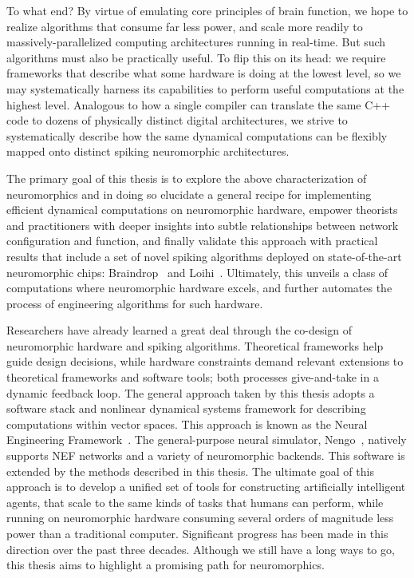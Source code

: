 To what end?
By virtue of emulating core principles of brain function, we hope to realize algorithms that consume far less power, and scale more readily to massively-parallelized computing architectures running in real-time.
But such algorithms must also be practically useful.
To flip this on its head: we require frameworks that describe what some hardware is doing at the lowest level,
so we may systematically harness its capabilities to perform useful computations at the highest level.
Analogous to how a single compiler can translate the same C++ code
to dozens of physically distinct digital architectures, we strive to systematically describe
how the same dynamical computations can be flexibly mapped onto distinct spiking neuromorphic architectures.

The primary goal of this thesis is to explore the above characterization of neuromorphics and in doing so elucidate a general recipe for implementing efficient dynamical computations on neuromorphic hardware, empower theorists and practitioners with deeper insights into subtle relationships between network configuration and function, and finally validate this approach with practical results that include a set of novel spiking algorithms deployed on state-of-the-art neuromorphic chips: Braindrop~\citep{braindrop2019} and Loihi~\citep{davies2018loihi}.
Ultimately, this unveils a class of computations where neuromorphic hardware excels, and further automates the process of engineering algorithms for such hardware.

Researchers have already learned a great deal through the co-design of neuromorphic hardware and spiking algorithms.
Theoretical frameworks help guide design decisions, while hardware constraints demand relevant extensions to theoretical frameworks and software tools; both processes give-and-take in a dynamic feedback loop.
The general approach taken by this thesis adopts a software stack and nonlinear dynamical systems framework
for describing computations within vector spaces.
This approach is known as the Neural Engineering Framework~\citep[NEF;][]{eliasmith2003a}.
The general-purpose neural simulator, Nengo~\citep{bekolay2014}, natively supports NEF networks and a variety of neuromorphic backends.
This software is extended by the methods described in this thesis.
The ultimate goal of this approach is to develop a unified set of tools for constructing
artificially intelligent agents, that scale to the same kinds of tasks that
humans can perform, while running on neuromorphic hardware consuming several orders of magnitude less power than a traditional computer.
Significant progress has been made in this direction over the past three decades.
Although we still have a long ways to go, this thesis aims to highlight a promising path for neuromorphics.

